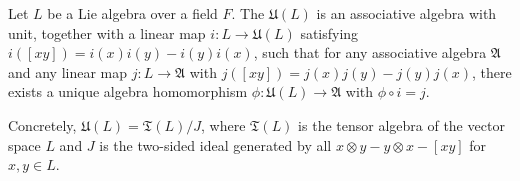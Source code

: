 Let $L$ be a Lie algebra over a field $F$. The  $\mathfrak{U}(L)$ is an associative algebra with unit, together with a linear map $i: L \rightarrow \mathfrak{U}(L)$ satisfying $i([xy]) = i(x)i(y) - i(y)i(x)$, such that for any associative algebra $\mathfrak{A}$ and any linear map $j: L \rightarrow \mathfrak{A}$ with $j([xy]) = j(x)j(y) - j(y)j(x)$, there exists a unique algebra homomorphism $\phi: \mathfrak{U}(L) \rightarrow \mathfrak{A}$ with $\phi \circ i = j$.

Concretely, $\mathfrak{U}(L) = \mathfrak{T}(L) / J$, where $\mathfrak{T}(L)$ is the tensor algebra of the vector space $L$ and $J$ is the two-sided ideal generated by all $x \otimes y - y \otimes x - [xy]$ for $x, y \in L$.
